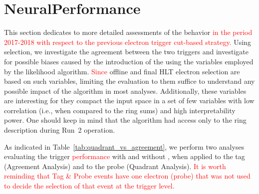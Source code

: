 
\section{Neural\rnn Performance}%
\label{sec:off_ana}

This section dedicates to more detailed assessments of the \rnn{} behavior 
\textcolor{red}{in the period 2017-2018 with respect to the previous electron trigger cut-based strategy.}
Using \Zee{} \tnp{}
selection, we investigate the agreement between the two triggers and investigate
for possible biases caused by the introduction of the \rnn{} using the variables
employed by the likelihood algorithm. \textcolor{red}{Since} offline and final HLT electron
selection are based on such variables, limiting the evaluation to them suffice
to understand any possible impact of the \rnn{} algorithm in most analyses.
Additionally, these variables are interesting for they compact the input space
in a set of few variables with low correlation (i.e., when compared to the ring
sums) and high interpretability power. One should keep in mind that the \rnn{}
algorithm had access only to the ring description during Run~2 operation.

As indicated in
Table~\ref{tab:quadrant_vs_agreement}, we perform two analyses evaluating the
trigger \textcolor{red}{performance} with and without \rnn{}, when applied to the tag (Agreement Analysis) and
to the probe (Quadrant Analysis).
\textcolor{red}{ It is worth reminding that Tag \& Probe events have one electron (probe) that was not used to decide the selection of that event at the trigger level.
}

\begin{table}[ht!]\footnotesize
\centering
\caption{Customized \Zee{} \tap{} selection criteria employed in the
agreement and quadrant analyses \textcolor{red}{in the Run 2 (2017-2018 period)}.}%
\label{tab:quadrant_vs_agreement}
\end{table}

